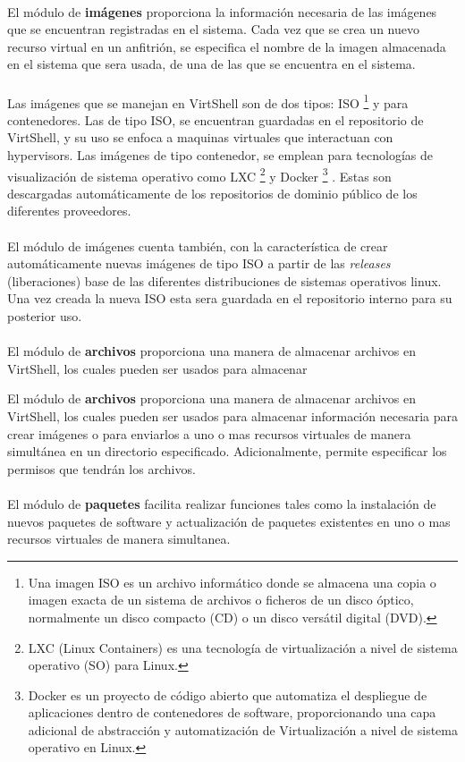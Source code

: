 \\
El módulo de \textbf{imágenes} proporciona la información necesaria de las imágenes que se encuentran registradas en el sistema. Cada vez que se crea un nuevo recurso virtual en un anfitrión, se especifica el nombre de la imagen almacenada en el sistema que sera usada, de una de las que se encuentra en el sistema. \\
\\
Las imágenes que se manejan en VirtShell son de dos tipos: ISO \footnote{Una imagen ISO es un archivo informático donde se almacena una copia o imagen exacta de un sistema de archivos o ficheros de un disco óptico, normalmente un disco compacto (CD) o un disco versátil digital (DVD).} y para contenedores. Las de tipo ISO, se encuentran guardadas en el repositorio de VirtShell, y su uso se enfoca a maquinas virtuales que interactuan con hypervisors. Las imágenes de tipo contenedor, se emplean para tecnologías de visualización de sistema operativo como LXC \footnote{LXC (Linux Containers) es una tecnología de virtualización a nivel de sistema operativo (SO) para Linux. } \cite{lxc16} y Docker \footnote{Docker es un proyecto de código abierto que automatiza el despliegue de aplicaciones dentro de contenedores de software, proporcionando una capa adicional de abstracción y automatización de Virtualización a nivel de sistema operativo en Linux.} \cite{docker16}. Estas son descargadas automáticamente de los repositorios de dominio público de los diferentes proveedores. \\
\\
El módulo de imágenes cuenta también, con la característica de crear automáticamente nuevas imágenes de tipo ISO a partir de las \emph{releases} (liberaciones) base de las diferentes distribuciones de sistemas operativos linux. Una vez creada la nueva ISO esta sera guardada en el repositorio interno para su posterior uso.\\
\\
El módulo de \textbf{archivos} proporciona una manera de almacenar archivos en VirtShell, los cuales pueden ser usados para almacenar 

El módulo de \textbf{archivos} proporciona una manera de almacenar archivos en VirtShell, los cuales pueden ser usados para almacenar información necesaria para crear imágenes o para enviarlos a uno o mas recursos virtuales de manera simultánea en un directorio especificado. Adicionalmente, permite especificar los permisos que tendrán los archivos.\\
\\
El módulo de \textbf{paquetes} facilita realizar funciones tales como la instalación de nuevos paquetes de software y actualización de paquetes existentes en uno o mas recursos virtuales de manera simultanea.


